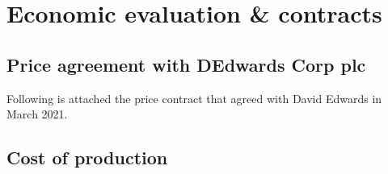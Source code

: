 \section{Economic evaluation \& contracts}

\subsection{Price agreement with DEdwards Corp plc}
\label{sec:price-agreement}
Following is attached the price contract that agreed with David Edwards in March 2021.


\subsection{Cost of production}
